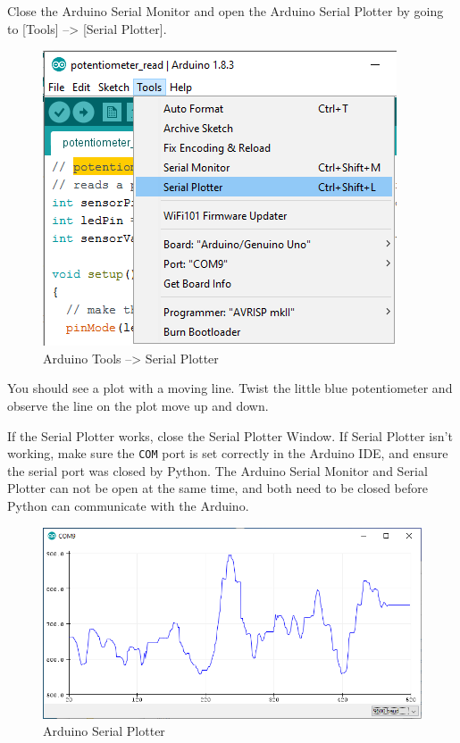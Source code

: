 Close the Arduino Serial Monitor and open the Arduino Serial
Plotter by going to {[}Tools{]} --\textgreater{} {[}Serial Plotter{]}.

\begin{figure}[h!]
\centering
\includegraphics{images/Tools_SerialPlotter.png}
\caption{Arduino Tools --\textgreater{} Serial Plotter}
\end{figure}

You should see a plot with a moving line. Twist the little blue
potentiometer and observe the line on the plot move up and down.

If the Serial Plotter works, close the Serial Plotter Window. If Serial
Plotter isn't working, make sure the
\texttt{\textquotesingle{}COM\textquotesingle{}} port is set correctly
in the Arduino IDE, and ensure the serial port was closed by Python. The
Arduino Serial Monitor and Serial Plotter can not be open at the same
time, and both need to be closed before Python can communicate with the
Arduino.

\begin{figure}[h!]
\centering
\includegraphics{images/serial_plotter_output.png}
\caption{Arduino Serial Plotter}
\end{figure}

